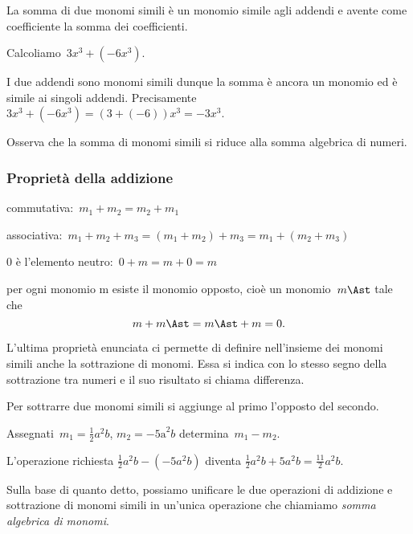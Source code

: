 La somma di due monomi simili è un monomio simile agli addendi e
avente come coefficiente la somma dei coefficienti.

\begin{exrig}
 \begin{esempio}
Calcoliamo~$3x^{3}+(-6x^{3})$.

I due addendi sono monomi simili dunque la somma è ancora un monomio
ed è simile ai singoli addendi. Precisamente
$3x^{3}+(-6x^{3})=(3+(-6))x^{3}=-3x^{3}$.

Osserva che la somma di monomi simili si riduce alla somma algebrica di numeri.
 \end{esempio}
\end{exrig}


\subsubsection{Proprietà della addizione}

\begin{enumeratea}
 \item commutativa:~$m_{1}+m_{2}=m_{2}+m_{1}$
 \item associativa:~$m_{1}+m_{2}+m_{3}=(m_{1}+m_{2})+m_{3}=m_{1}+(m_{2}+m_{3})$
 \item 0 è l'elemento neutro:~$0+m=m+0=m$
 \item per ogni monomio m esiste il monomio opposto, cioè un
 monomio~$m\Ast$ tale che
 \[m + m\Ast = m\Ast +m=0.\]
\end{enumeratea}

L'ultima proprietà enunciata ci permette di definire
nell'insieme dei monomi simili anche la sottrazione di
monomi. Essa si indica con lo stesso segno della sottrazione tra numeri
e il suo risultato si chiama differenza.

\osservazione Per sottrarre due monomi simili si aggiunge al primo
l'opposto del secondo.

\begin{exrig}
 \begin{esempio}
Assegnati~$m_{1}=\frac{1}{2}a^{2}b$, $m_{2}=-\text{5a}^{2}b$ determina~$m_{1} - m_{2}$.

L'operazione richiesta
$\frac{1}{2}a^{2}b-(-5a^{2}b)$ diventa
$\frac{1}{2}a^{2}b+5a^{2}b=\frac{11}{2}a^{2}b$.
 \end{esempio}
\end{exrig}

Sulla base di quanto detto, possiamo unificare le due operazioni di
addizione e sottrazione di monomi simili in un'unica
operazione che chiamiamo \emph{somma algebrica di monomi}.

